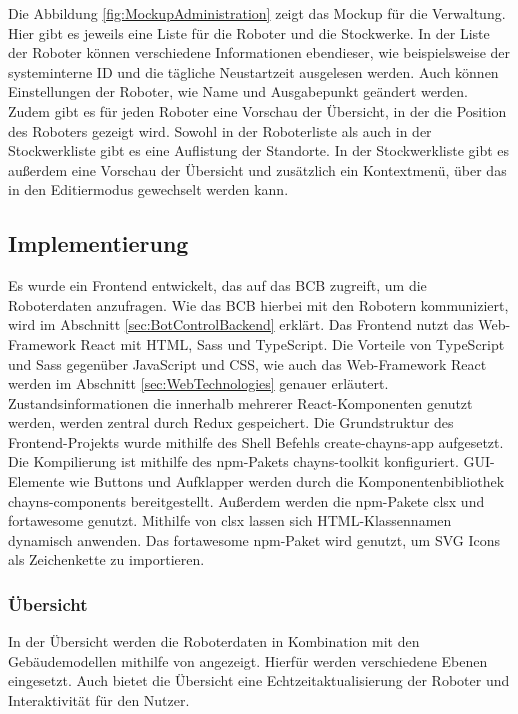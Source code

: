 Die Abbildung \ref{fig:MockupAdministration} zeigt das \gls{Mockup} für die Verwaltung. Hier gibt es jeweils eine Liste für die Roboter und die Stockwerke. In der Liste der Roboter können verschiedene Informationen ebendieser, wie beispielsweise der systeminterne \ac{ID} und die tägliche Neustartzeit ausgelesen werden. Auch können Einstellungen der Roboter, wie Name und Ausgabepunkt geändert werden. Zudem gibt es für jeden Roboter eine Vorschau der Übersicht, in der die Position des Roboters gezeigt wird. Sowohl in der Roboterliste als auch in der Stockwerkliste gibt es eine Auflistung der Standorte. In der Stockwerkliste gibt es außerdem eine Vorschau der Übersicht und zusätzlich ein Kontextmenü, über das in den Editiermodus gewechselt werden kann.

\subsection{Implementierung}
Es wurde ein Frontend entwickelt, das auf das \ac{BCB} zugreift, um die Roboterdaten anzufragen. Wie das \ac{BCB} hierbei mit den Robotern kommuniziert, wird im Abschnitt \ref{sec:BotControlBackend} erklärt. Das Frontend nutzt das Web-Framework React mit \ac{HTML}, \ac{Sass} und TypeScript. Die Vorteile von TypeScript und \ac{Sass} gegenüber JavaScript und \ac{CSS}, wie auch das Web-Framework React werden im Abschnitt \ref{sec:WebTechnologies} genauer erläutert. Zustandsinformationen die innerhalb mehrerer React-Komponenten genutzt werden, werden zentral durch Redux gespeichert. Die Grundstruktur des Frontend-Projekts wurde mithilfe des Shell Befehls create-chayns-app \cite{CreateChaynsApp} aufgesetzt. Die Kompilierung ist mithilfe des \ac{npm}-Pakets chayns-toolkit \cite{ChaynsToolkit} konfiguriert. \ac{GUI}-Elemente wie Buttons und Aufklapper werden durch die Komponentenbibliothek chayns-components \cite{ChaynsComponents} bereitgestellt. Außerdem werden die \ac{npm}-Pakete clsx \cite{clsx} und fortawesome \cite{fontawesome} genutzt. Mithilfe von clsx lassen sich \ac{HTML}-Klassennamen dynamisch anwenden. Das fortawesome \ac{npm}-Paket wird genutzt, um \ac{SVG} Icons als Zeichenkette zu importieren.

\subsubsection{Übersicht}
In der Übersicht werden die Roboterdaten in Kombination mit den Gebäudemodellen mithilfe von \deckgl{} angezeigt. Hierfür werden verschiedene Ebenen eingesetzt. Auch bietet die Übersicht eine Echtzeitaktualisierung der Roboter und Interaktivität für den Nutzer.

